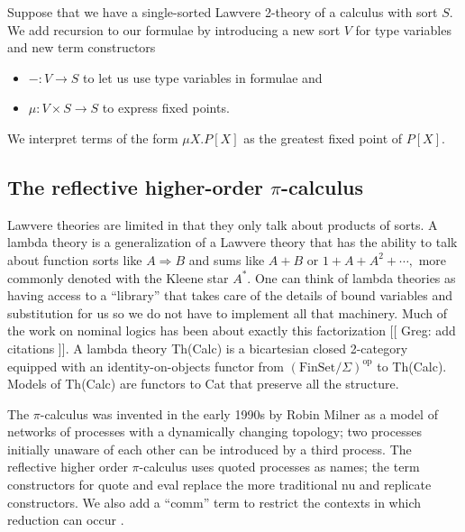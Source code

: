 \documentclass{llncs}
\newcommand{\maps}{\colon}
\newcommand{\FinSet}{\mathrm{FinSet}}
\newcommand{\op}{\mathrm{op}}
\begin{document}
Suppose that we have a single-sorted Lawvere 2-theory of a calculus with sort $S$.  We add recursion to our formulae by introducing a new sort $V$ for type variables and new term constructors 
\begin{itemize}
  \item $- \maps V \to S$ to let us use type variables in formulae and
  \item $\mu\maps V\times S \to S$ to express fixed points.
\end{itemize}

We interpret terms of the form $\mu X.P[X]$ as the greatest fixed point of $P[X].$

\subsection{The reflective higher-order $\pi$-calculus}

Lawvere theories are limited in that they only talk about products of sorts.  A lambda theory is a generalization of a Lawvere theory that has the ability to talk about function sorts like $A \Rightarrow B$ and sums like $A+B$ or $1 + A + A^2 + \cdots,$ more commonly denoted with the Kleene star $A^*.$  One can think of lambda theories as having access to a ``library'' that takes care of the details of bound variables and substitution for us so we do not have to implement all that machinery.  Much of the work on nominal logics has been about exactly this factorization [[ Greg: add citations ]].  A lambda theory Th(Calc) is a bicartesian closed 2-category equipped with an identity-on-objects functor from $(\FinSet/\Sigma)^{\op}$ to Th(Calc).  Models of Th(Calc) are functors to Cat that preserve all the structure.

The $\pi$-calculus was invented in the early 1990s by Robin Milner as a model of networks of processes with a dynamically changing topology; two processes initially unaware of each other can be introduced by a third process.  The reflective higher order $\pi$-calculus uses quoted processes as names; the term constructors for quote and eval replace the more traditional nu and replicate constructors.  We also add a ``comm'' term to restrict the contexts in which reduction can occur \cite{HDRA}.
\end{document}
